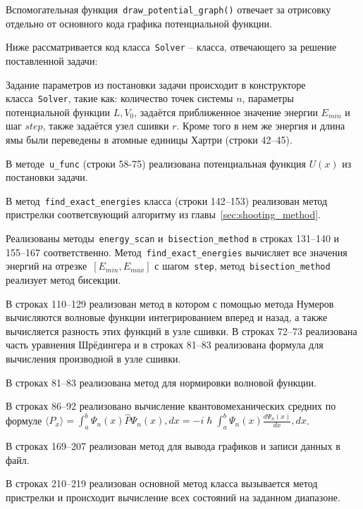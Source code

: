 \documentclass[a4paper,12pt]{article}
\begin{document}
Вспомогательная функция~\lstinline[language=Python, columns=fixed]{draw_potential_graph()} отвечает за отрисовку отдельно от основного кода графика потенциальной функции.


Ниже рассматривается код класса~\lstinline[columns=fixed]{Solver} -- класса, отвечающего за решение поставленной задачи:

Задание параметров из постановки задачи происходит в конструкторе класса~\lstinline[columns=fixed]{Solver}, такие как: количество точек системы $n$, параметры потенциальной функции $L,V_0$, задаётся приближенное значение энергии $E_{min}$ и шаг $step$, также задаётся узел сшивки $r$.
Кроме того в нем же энергия и длина ямы были переведены в атомные единицы Хартри (строки 42--45).

В методе~\lstinline[columns=fixed]{u_func} (строки 58-75) реализована потенциальная функция $U(x)$ из постановки задачи.


В метод~\lstinline[columns=fixed]{find_exact_energies} класса (строки 142--153) реализован метод пристрелки соответсвующий алгоритму из главы~\ref{sec:shooting_method}.


Реализованы методы~\lstinline[columns=fixed]{energy_scan} и~\lstinline[columns=fixed]{bisection_method} в строках 131--140 и 155--167 соответственно.
Метод~\lstinline[columns=fixed]{find_exact_energies} вычисляет все значения энергий на отрезке~$\left[ E_{min}, E_{max} \right]$ с шагом~\lstinline[columns=fixed]{step},
метод~\lstinline[columns=fixed]{bisection_method} реализует метод бисекции.


В строках 110--129 реализован метод в котором с помощью метода Нумеров вычисляются волновые функции интегрированием вперед и назад, а также вычисляется разность этих функций в узле сшивки.
В строках 72--73 реализована часть уравнения Шрёдингера и в строках 81--83 реализована формула для вычисления производной в узле сшивки.


В строках 81--83 реализована метод для нормировки волновой функции.


В строках 86--92 реализовано вычисление квантовомеханических средних по формуле
$\langle P_x \rangle = \int_{a}^{b}\Psi_n(x)\hat{P}\Psi_n(x),dx = -i \hslash\int_{a}^{b}\Psi_n(x)\frac{d\Psi_n(x)}{dx},dx$.


В строках 169--207 реализован метод для вывода графиков и записи данных в файл.


В строках 210--219 реализован основной метод класса вызывается метод пристрелки и происходит вычисление всех состояний на заданном диапазоне.
\end{document}
